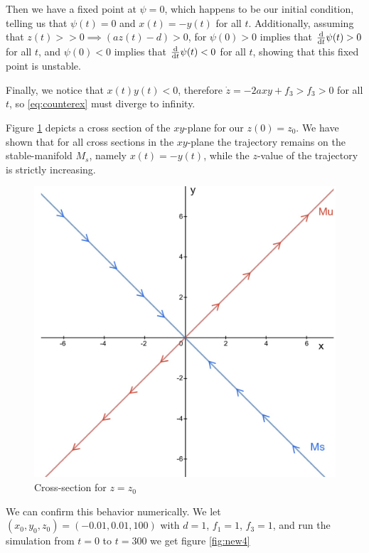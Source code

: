 \documentclass[11pt]{article}
\begin{document}
Then we have a fixed point at $\psi = 0$, which happens to be our initial condition, telling us that $\psi(t) = 0$ and $x(t) = -y(t)$ for all $t$. Additionally, assuming that $z(t)>>0 \implies (az(t) - d) > 0$, for $\psi(0) > 0$ implies that $\dv{}{t}\psi(t) > 0$ for all $t$, and $\psi(0) < 0$ implies that $\dv{}{t}\psi(t) < 0$ for all $t$, showing that this fixed point is unstable. 

Finally, we notice that $x(t)y(t) < 0$, therefore $\dot{z} = -2axy + f_3 > f_3 > 0$ for all $t$, so \eqref{eq:counterex} must diverge to infinity.

Figure \ref{fig:stable} depicts a cross section of the $xy$-plane for our $z(0) = z_0$. We have shown that for all cross sections in the $xy$-plane the trajectory remains on the stable-manifold $M_s$, namely $x(t) = -y(t)$, while the $z$-value of the trajectory is strictly increasing.  
\begin{figure}[h!]
    \centering
    \includegraphics[width=0.4\linewidth]{IMG_0735.jpeg}
    \caption{Cross-section for $z = z_0$}
    \label{fig:stable}
\end{figure}
We can confirm this behavior numerically. We let $(x_0, y_0, z_0) = (-0.01, 0.01, 100)$ with $d = 1$, $f_1 = 1$, $f_3 = 1$, and run the simulation from $t= 0$ to $t = 300$ we get figure \ref{fig:new4}
\end{document}

